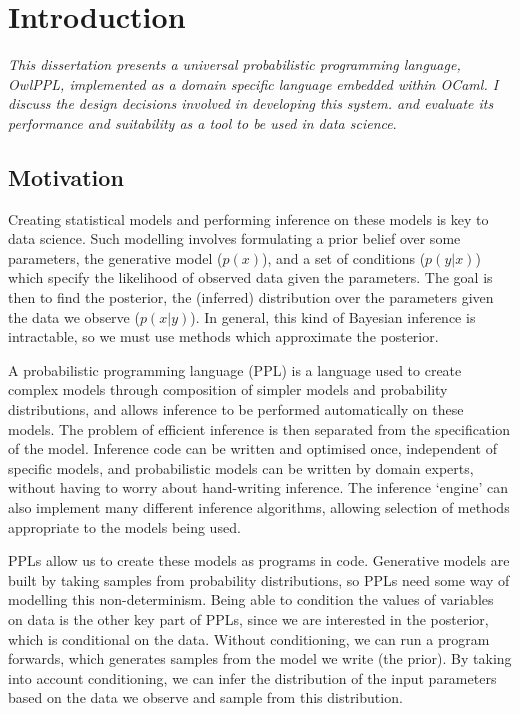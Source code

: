 \chapter{Introduction}

\textit{This dissertation presents a universal probabilistic programming language, OwlPPL, implemented as a domain specific language embedded within OCaml. I discuss the design decisions involved in developing this system. and evaluate its performance and suitability as a tool to be used in data science}.

\section{Motivation}
Creating statistical models and performing inference on these models is key to data science. Such modelling involves formulating a prior belief over some parameters, the generative model ($p(x)$), and a set of conditions ($p(y|x)$) which specify the likelihood of observed data given the parameters. The goal is then to find the posterior, the (inferred) distribution over the parameters given the data we observe ($p(x|y)$). In general, this kind of Bayesian inference is intractable, so we must use methods which approximate the posterior.

A probabilistic programming language (PPL) is a language used to create complex models through composition of simpler models and probability distributions, and allows inference to be performed automatically on these models. The problem of efficient inference is then separated from the specification of the model. Inference code can be written and optimised once, independent of specific models, and probabilistic models can be written by domain experts, without having to worry about hand-writing inference. The inference `engine' can also implement many different inference algorithms, allowing selection of methods appropriate to the models being used.

PPLs allow us to create these models as programs in code. Generative models are built by taking samples from probability distributions, so PPLs need some way of modelling this non-determinism. Being able to condition the values of variables on data is the other key part of PPLs, since we are interested in the posterior, which is conditional on the data. Without conditioning, we can run a program forwards, which generates samples from the model we write (the prior). By taking into account conditioning, we can infer the distribution of the input parameters based on the data we observe and sample from this distribution.

